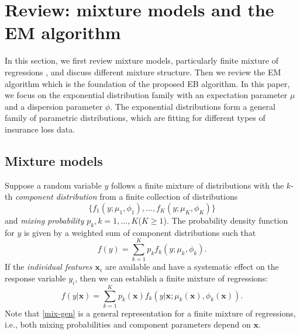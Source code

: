 \documentclass[11pt]{article}
\numberwithin{equation}{section}
\def\bx{\boldsymbol{x}}
\begin{document}
\section{Review: mixture models and the EM algorithm}\label{sec:review}

In this section, we first review mixture models, particularly finite mixture of regressions \citep{peel2000finite}, and discuss different mixture structure. 
Then we review the EM algorithm which is the foundation of the proposed EB algorithm. 
In this paper, we focus on the exponential distribution family with an expectation parameter $\mu$ and a dispersion parameter $\phi$. 
The exponential distributions form a general family of parametric distributions, which are fitting for different types of insurance loss data.

\subsection{Mixture models}\label{review:mix1}
Suppose a random variable $y$ follows a finite mixture of distributions with the $k$-th {\it component distribution} from a finite collection of distributions
	$$\{f_1(y;\mu_1,\phi_1),\ldots,f_K(y;\mu_K,\phi_K)\}$$
	and \textit{mixing probability} $p_k, k=1,\ldots,K$($K \geqslant 1$).
	The probability density function for $y$ is given by a weighted sum of component distributions such that
	$$f(y)=\sum_{k=1}^Kp_kf_k(y;\mu_k,\phi_k).$$
	If the {\it individual features $\bx_i$} are available and have a systematic effect on the response variable $y_i$, then we can establish a finite mixture of regressions:
	\begin{equation}\label{mix-gen}
		f(y|\bx)=\sum_{k=1}^Kp_k(\bx)f_k(y|\bx;\mu_k(\bx),\phi_k(\bx)).
	\end{equation}
	Note that \eqref{mix-gen} is a general representation for a finite mixture of regressions, 
	i.e., both mixing probabilities and component parameters depend on $\bx$.
	 
\end{document}
